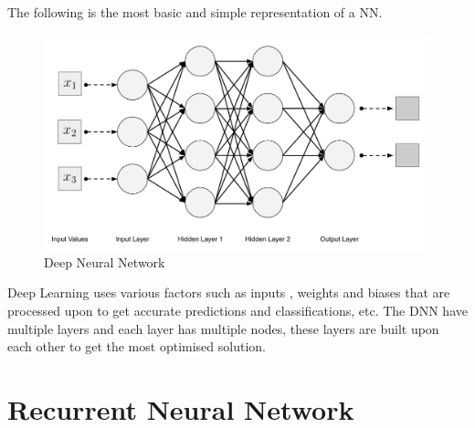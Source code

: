 \documentclass[oneside,12pt]{Classes/RoboticsLaTeX}
\begin{document}
The following is the most basic and simple representation of a NN.

\begin{figure}[H]
  \centering
  \includegraphics[width=0.80\linewidth]{Figures/dnn.png}
  \caption{Deep Neural Network}
  \label{fig:dnn}
\end{figure}

Deep Learning  uses various factors such as inputs , weights and biases that are processed upon to get accurate predictions and classifications, etc. The DNN have multiple layers and each layer has multiple nodes, these layers are built upon each other to get the most optimised solution.

\section{Recurrent Neural Network}
\end{document}
